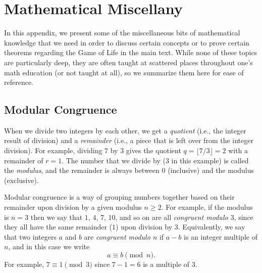 
\renewcommand{\chapterfolder}{appendices/}

\chapter{Mathematical Miscellany}\label{app:math}

In this appendix, we present some of the miscellaneous bits of mathematical knowledge that we need in order to discuss certain concepts or to prove certain theorems regarding the Game of Life in the main text. While none of these topics are particularly deep, they are often taught at scattered places throughout one's math education (or not taught at all), so we summarize them here for ease of reference.


\section{Modular Congruence}\label{sec:modular_arithmetic}

When we divide two integers by each other, we get a \emph{quotient} (i.e., the integer result of division) and a \emph{remainder} (i.e., a piece that is left over from the integer division). For example, dividing $7$ by $3$ gives the quotient $q = \lfloor 7/3 \rfloor = 2$ with a remainder of $r = 1$. The number that we divide by ($3$ in this example) is called the \emph{modulus}, and the remainder is always between $0$ (inclusive) and the modulus (exclusive).

Modular congruence is a way of grouping numbers together based on their remainder upon division by a given modulus $n \geq 2$. For example, if the modulus is $n = 3$ then we say that $1$, $4$, $7$, $10$, and so on are all \emph{congruent modulo $3$}, since they all have the same remainder ($1$) upon division by $3$. Equivalently, we say that two integers $a$ and $b$ are \emph{congruent modulo $n$} if $a-b$ is an integer multiple of $n$, and in this case we write
\[
	a \equiv b \pmod{n}.
\]
For example, $7 \equiv 1 \pmod{3}$ since $7 - 1 = 6$ is a multiple of $3$.


